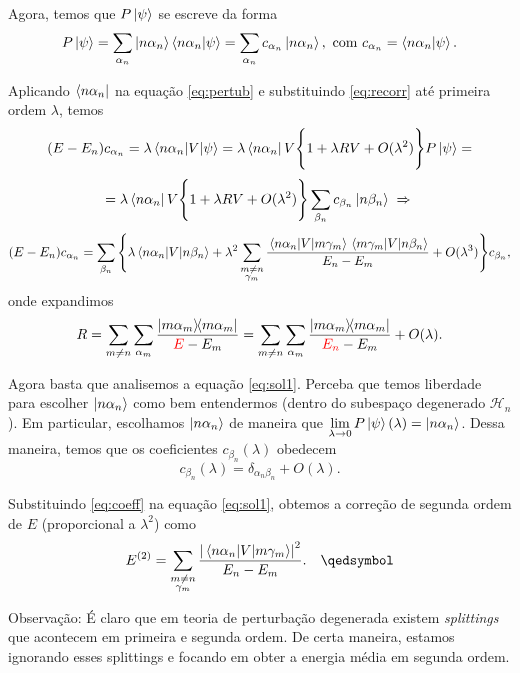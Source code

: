 \documentclass[a4paper,10pt]{article}
\begin{document}
Agora, temos que $P \ket{\psi}$ se escreve da forma
$$
P \ket{\psi} = \sum_{\alpha_n} \ket{n \alpha_n} \braket{n\alpha_n}{\psi} =
\sum_{\alpha_n} c_{\alpha_n} \ket{n \alpha_n}, \text{ com } c_{\alpha_n} = \braket{n\alpha_n}{\psi}.
$$

Aplicando $\bra{n \alpha_n}$ na equação \ref{eq:pertub} e substituindo \ref{eq:recorr} até primeira ordem $\lambda$, temos
$$
(E - E_n) c_{\alpha_n} = \lambda \mel{n \alpha_n}{V}{\psi} =
\lambda \bra{n \alpha_n} V \Bigg\{ 1 + \lambda R V + O(\lambda^2) \Bigg\} P \ket{\psi} =
$$
$$
=
\lambda \bra{n \alpha_n} V \Bigg\{ 1 + \lambda R V + O(\lambda^2) \Bigg\} \sum_{\beta_n} c_{\beta_n} \ket{n \beta_n} \; \Rightarrow \;
$$
\begin{equation} \label{eq:sol1}
(E - E_n) c_{\alpha_n} =
\sum_{\beta_n} \Bigg\{
\lambda \mel{n \alpha_n}{V}{n \beta_n} + \lambda^2 \sum_{\substack{m \neq n \\ \gamma_m}}
\frac{\mel{n \alpha_n}{V}{m \gamma_m} \mel{m \gamma_m}{V}{n \beta_n}}{E_n - E_m} + O(\lambda^3)
\Bigg\} c_{\beta_n},
\end{equation}
onde expandimos
$$
R = \sum_{m \neq n} \sum_{\alpha_m} \frac{\ketbra{m \alpha_m}}{\textcolor{red}{E} - E_m}
= \sum_{m \neq n} \sum_{\alpha_m} \frac{\ketbra{m \alpha_m}}{\textcolor{red}{E_n} - E_m} + O(\lambda).
$$

Agora basta que analisemos a equação \ref{eq:sol1}. Perceba que temos liberdade para escolher $\ket{n \alpha_n}$ como bem entendermos (dentro do subespaço degenerado $\mathcal{H}_n$). Em particular, escolhamos $\ket{n \alpha_n}$ de maneira que $\displaystyle{\lim_{\lambda \to 0} P \ket{\psi} (\lambda) = \ket{n \alpha_n}}$. Dessa maneira, temos que os coeficientes $c_{\beta_n}(\lambda)$ obedecem
\begin{equation} \label{eq:coeff}
c_{\beta_n}(\lambda) = \delta_{\alpha_n \beta_n} + O(\lambda).
\end{equation}

Substituindo \ref{eq:coeff} na equação \ref{eq:sol1}, obtemos a correção de segunda ordem de $E$ (proporcional a $\lambda^2$) como
$$
E^{(2)} = \sum_{\substack{m \neq n \\ \gamma_m}} \frac{\abs{\mel{n \alpha_n}{V}{m \gamma_m}}^2}{E_n - E_m}.
\quad \qedsymbol
$$

Observação: É claro que em teoria de perturbação degenerada existem \textit{splittings} que acontecem em primeira e segunda ordem. De certa maneira, estamos ignorando esses splittings e focando em obter a energia média em segunda ordem.
\end{document}
